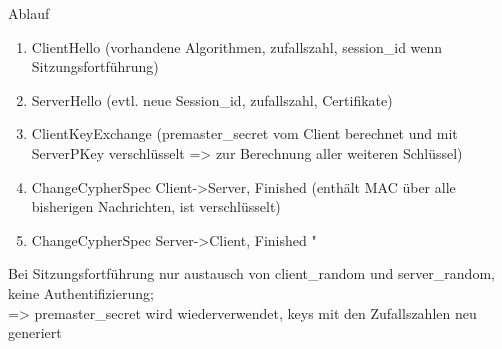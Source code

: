 Ablauf
\begin{enumerate}
\item ClientHello (vorhandene Algorithmen, zufallszahl, session\_id wenn Sitzungsfortführung)
\item ServerHello (evtl. neue Session\_id, zufallszahl, Certifikate)
\item ClientKeyExchange (premaster\_secret vom Client berechnet und mit ServerPKey verschlüsselt => zur Berechnung aller weiteren Schlüssel)
\item ChangeCypherSpec Client->Server, Finished (enthält MAC über alle bisherigen Nachrichten, ist verschlüsselt)
\item ChangeCypherSpec Server->Client, Finished "
\end{enumerate}
Bei Sitzungsfortführung nur austausch von client\_random und server\_random, keine Authentifizierung;\\
=> premaster\_secret wird wiederverwendet, keys mit den Zufallszahlen neu generiert

